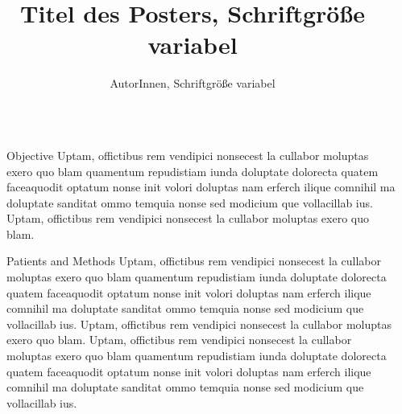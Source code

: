 \documentclass[final]{beamer}
\title{Titel des Posters, Schriftgröße variabel} %
\author{AutorInnen, Schriftgröße variabel} %
\institute{Klinik, Medizinische Universität Wien, Schriftgröße variabel} %
\newlength{\sepmargin}
\newlength{\onecolwid}
\begin{document}
	
	\setlength{\belowcaptionskip}{2ex} %
	\setlength\belowdisplayshortskip{1ex} %
	
	
	\begin{frame}[t] %
		
		\begin{columns}[t] %
			
			\begin{column}{\sepmargin}\end{column}
			
			\begin{column}{\onecolwid} %
				
				
				\begin{block}{Objective}
					Uptam, offictibus rem vendipici nonsecest la cullabor moluptas exero quo blam quamentum repudistiam iunda doluptate dolorecta quatem faceaquodit optatum nonse init volori doluptas nam erferch ilique comnihil ma doluptate sanditat ommo temquia nonse sed modicium que vollacillab ius. Uptam, offictibus rem vendipici nonsecest la cullabor moluptas exero quo blam.
				\end{block}
				
				\begin{block}{Patients and Methods}
					Uptam, offictibus rem vendipici nonsecest la cullabor moluptas exero quo blam quamentum repudistiam iunda doluptate dolorecta quatem faceaquodit optatum nonse init volori doluptas nam erferch ilique comnihil ma doluptate sanditat ommo temquia nonse sed modicium que vollacillab ius. Uptam, offictibus rem vendipici nonsecest la cullabor moluptas exero quo blam.
					Uptam, offictibus rem vendipici nonsecest la cullabor moluptas exero quo blam quamentum repudistiam iunda doluptate dolorecta quatem faceaquodit optatum nonse init volori doluptas nam erferch ilique comnihil ma doluptate sanditat ommo temquia nonse sed modicium que vollacillab ius.
				\end{block}
				

\end{column}
\end{columns}
\end{frame}
\end{document}
